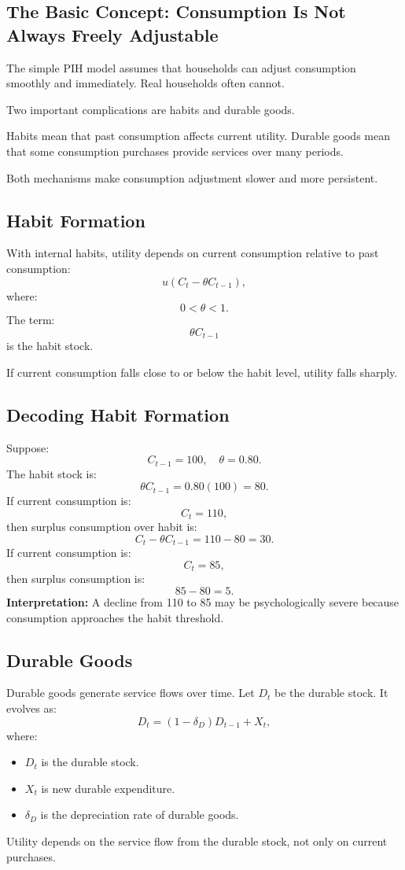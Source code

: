 \documentclass[12pt,a4paper]{article}
\begin{document}
\subsection*{The Basic Concept: Consumption Is Not Always Freely Adjustable}
The simple PIH model assumes that households can adjust consumption smoothly and immediately. Real households often cannot.

Two important complications are habits and durable goods.

Habits mean that past consumption affects current utility. Durable goods mean that some consumption purchases provide services over many periods.

Both mechanisms make consumption adjustment slower and more persistent.

\subsection*{Habit Formation}
With internal habits, utility depends on current consumption relative to past consumption:
\[ u(C_t - \theta C_{t-1}), \]
where:
\[ 0 < \theta < 1. \]
The term:
\[ \theta C_{t-1} \]
is the habit stock.

If current consumption falls close to or below the habit level, utility falls sharply.

\subsection*{Decoding Habit Formation}
Suppose:
\[ C_{t-1} = 100, \quad \theta = 0.80. \]
The habit stock is:
\[ \theta C_{t-1} = 0.80(100) = 80. \]
If current consumption is:
\[ C_t = 110, \]
then surplus consumption over habit is:
\[ C_t - \theta C_{t-1} = 110 - 80 = 30. \]
If current consumption is:
\[ C_t = 85, \]
then surplus consumption is:
\[ 85 - 80 = 5. \]
\textbf{Interpretation:} A decline from 110 to 85 may be psychologically severe because consumption approaches the habit threshold.

\subsection*{Durable Goods}
Durable goods generate service flows over time. Let $D_t$ be the durable stock. It evolves as:
\[ D_t = (1 - \delta_D) D_{t-1} + X_t, \]
where:
\begin{itemize}
    \item $D_t$ is the durable stock.
    \item $X_t$ is new durable expenditure.
    \item $\delta_D$ is the depreciation rate of durable goods.
\end{itemize}
Utility depends on the service flow from the durable stock, not only on current purchases.
\end{document}
